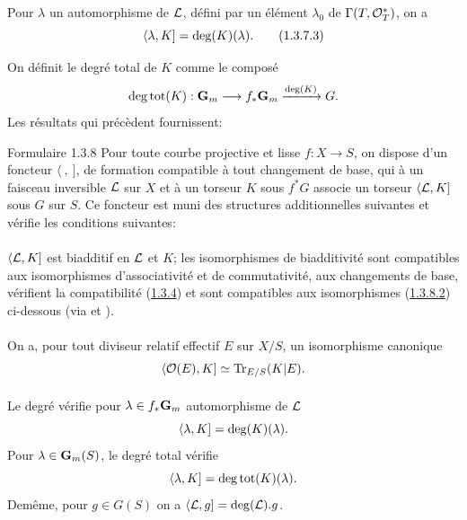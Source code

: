 \documentclass[10pt]{../fichiers-configuration-latex/smfart}
\begin{document}
Pour $\lambda$ un automorphisme de ${\mathcal L}$, défini par un
élément $\lambda_{0}$ de $\Gamma(T,{\mathcal O}^{\ast}_{T})$, on a
\begin{equation*}
\langle \lambda,K]=\deg(K)(\lambda){}.\tag{1.3.7.3}
\end{equation*}

On définit le degré total de $K$ comme le composé
$$
\deg \operatorname{tot}(K):\mathbf{G}_{m}\longrightarrow
f_{\ast}\mathbf{G}_{m}\xrightarrow{\deg(K)}G{}.
$$
Les résultats qui précèdent fournissent:

\begin{enonce*}[remark]{Formulaire 1.3.8}
Pour toute courbe projective et lisse $f:X\rightarrow S$, on dispose
d'un foncteur $\langle~,~]$, de formation compatible à tout changement de
base, qui à un faisceau inversible ${\mathcal L}$ sur $X$ et à un
torseur $K$ sous $f^{\ast}G$ associe un torseur $\langle {\mathcal L},K]$ sous
$G$ sur $S$. Ce foncteur est muni des structures additionnelles
suivantes et vérifie les conditions suivantes:
\end{enonce*}

\setcounter{subsubsection}{8}
\paragraph{}
$\langle {\mathcal L},K]$ est biadditif en ${\mathcal L}$ et $K$; les
isomorphismes de biadditivité sont compatibles aux isomorphismes
d'associativité et de commutativité, aux changements de base,
vérifient la compatibilité (\hyperref[XVIII.prop1.3.4]{1.3.4}) et sont compatibles aux
isomorphismes (\hyperref[XVIII.par1.3.8.2]{1.3.8.2}) ci-dessous (via
 et ).

\paragraph{}
On a, pour tout diviseur relatif effectif $E$ sur $X/S$, un
isomorphisme canonique
$$
\langle {\mathcal O}(E),K]\simeq \operatorname{Tr}_{E/S}(K|E){}.
$$

\paragraph{}
Le degré  vérifie pour $\lambda\in f_{\ast}\mathbf{G}_{m}$
automorphisme de ${\mathcal L}$
$$
\langle \lambda,K]=\deg(K)(\lambda){}.
$$
Pour $\lambda\in \mathbf{G}_{m}(S)$, le degré total vérifie
$$
\langle \lambda,K]=\deg\operatorname{tot}(K)(\lambda){}.
$$
De\pageoriginale même, pour $g\in G(S)$ on a
$\langle {\mathcal L},g]=\deg({\mathcal L}).g$.
\end{document}

